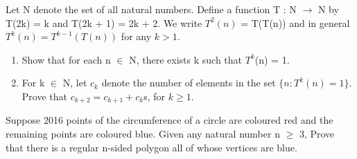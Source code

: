 \item Let N denote the set of all natural numbers. Define a function T : N $\to$ N by
T(2k) = k and T(2k + 1) = 2k + 2. We write $T^{2}(n)$ = T(T(n)) and in general
$T^{k}(n) = T^{k-1}(T(n))$ for any $k > 1$.
\begin{enumerate}
\item Show that for each n $\in$ N, there exists k such that $T^{k}$(n) = 1.
\item For k $\in$ N, let $c_k$ denote the number of elements in the set $\{n : T^{k}(n) = 1\}$.
Prove that $c_{k+2} = c_{k+1} + c_{k}$s, for $k \geq 1$.
\end{enumerate}

\item Suppose 2016 points of the circumference of a circle are coloured red and the remaining points are coloured blue. Given any natural number n $\geq$ 3, Prove that there is a regular n-sided polygon all of whose vertices are blue.